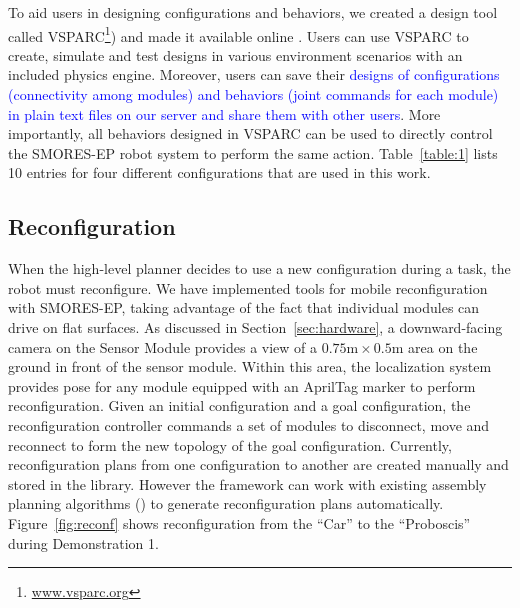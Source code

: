 \documentclass[12pt]{article}
\newcommand{\TODO}[1]{ {\bf \textcolor{red}{TODO:} #1 }}
\newcommand{\abj}[1]{\textcolor{blue}{#1}}
\begin{document}
To aid users in designing configurations and behaviors, we created a design tool called VSPARC\footnote{\url{www.vsparc.org}}) and made it available online \cite{JingAURO2017}.
Users can use VSPARC to create, simulate and test designs in various environment scenarios with an included physics engine.
Moreover, users can save their \abj{designs of configurations (connectivity among modules) and behaviors (joint commands for each module) in plain text files on our server and share them with other users}.
More importantly, all behaviors designed in VSPARC can be used to directly control the SMORES-EP robot system to perform the same action.
Table~\ref{table:1} lists 10 entries for four different configurations that are used in this work. %


\subsection{Reconfiguration}
\label{sec:reconfiguration}
%
When the high-level planner decides to use a new configuration during a task, the robot must reconfigure.
We have implemented tools for mobile reconfiguration with SMORES-EP, taking advantage of the fact that individual modules can drive on flat surfaces.
As discussed in Section~\ref{sec:hardware}, a downward-facing camera on the Sensor Module provides a view of a $0.75\text{m}\times0.5\text{m}$ area on the ground in front of the sensor module.  
Within this area, the localization system provides pose for any module equipped with an AprilTag marker to perform reconfiguration. 
Given an initial configuration and a goal configuration, the reconfiguration controller commands a set of modules to disconnect, move and reconnect to form the new topology of the goal configuration. 
Currently, reconfiguration plans from one configuration to another are created manually and stored in the library. However the framework can work with existing assembly planning algorithms (\cite{Werfel2007,Seo2013}) to generate reconfiguration plans automatically.
Figure~\ref{fig:reconf} shows reconfiguration from the ``Car'' to the ``Proboscis'' during Demonstration 1.
%
\end{document}
